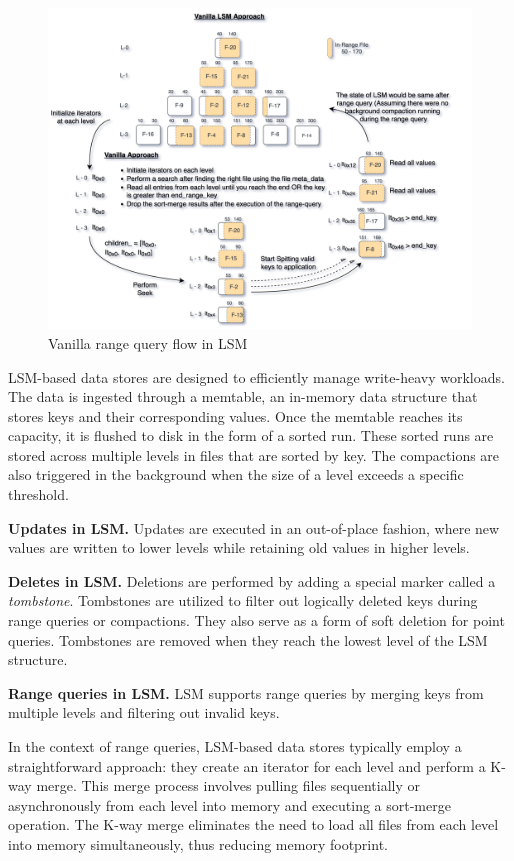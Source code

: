 \begin{figure}
    \includegraphics[scale=0.10]{Figures/Vanilla Range Query vanilla.png}
    \caption{Vanilla range query flow in LSM}\label{fig:vanilla_range_query}
\end{figure}

LSM-based data stores are designed to efficiently manage write-heavy workloads. The data is ingested through 
a memtable, an in-memory data structure that stores keys and their corresponding values. Once the memtable reaches its 
capacity, it is flushed to disk in the form of a sorted run. These sorted runs are stored across multiple levels in 
files that are sorted by key. The compactions are also triggered in the background when the size of a level exceeds a 
specific threshold.

\textbf{Updates in LSM.} Updates are executed in an out-of-place fashion, where new values are written to lower levels 
while retaining old values in higher levels.

\textbf{Deletes in LSM.} Deletions are performed by adding a special marker called a \textit{tombstone}. Tombstones are 
utilized to filter out logically deleted keys during range queries or compactions. They also serve as a form of soft 
deletion for point queries. Tombstones are removed when they reach the lowest level of the LSM structure.

\textbf{Range queries in LSM.} LSM supports range queries by merging keys from multiple levels and filtering out 
invalid keys.

In the context of range queries, LSM-based data stores typically employ a straightforward approach: they create an 
iterator for each level and perform a K-way merge. This merge process involves pulling files sequentially or 
asynchronously from each level into memory and executing a sort-merge operation. The K-way merge eliminates the need 
to load all files from each level into memory simultaneously, thus reducing memory footprint.

